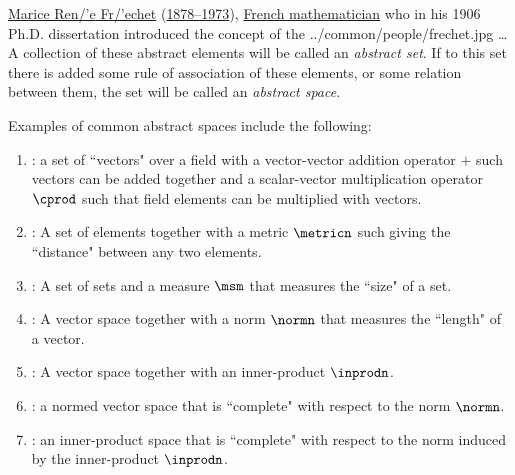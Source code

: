 \qboxnps
  {\href{http://en.wikipedia.org/wiki/Frechet}{Marice Ren{/'e} Fr{/'e}chet}
   (\href{http://www-history.mcs.st-andrews.ac.uk/Timelines/TimelineF.html}{1878--1973}),
   \href{http://www-history.mcs.st-andrews.ac.uk/BirthplaceMaps/Places/France.html}{French mathematician}
   who in his 1906 Ph.D. dissertation introduced the concept of the 
   \footnotemark
  }
  {../common/people/frechet.jpg}
  {\ldots
   A collection of these abstract elements will be called an \emph{abstract set}.
   If to this set there is added some rule of association of these elements,
   or some relation between them,
   the set will be called an \emph{abstract space}.}

Examples of common abstract spaces include the following:
\begin{enumerate}
  \item {}:
        a set of ``vectors" over a field
        with a vector-vector addition operator $+$ such vectors can be added together
        and a scalar-vector multiplication operator $\cprod$
        such that field elements can be multiplied with vectors.
        \\

  \item {}:
        A set of elements together with a metric $\metricn$ such giving the ``distance"
        between any two elements.
        \\

  \item {}:
        A set of sets and a measure $\msm$ that measures the ``size" of a set.

  \item {}:
        A vector space together with a norm $\normn$ that measures the ``length" of a vector.
        \\

  \item {}:
        A vector space together with an inner-product $\inprodn$.

  \item {}:
        a normed vector space that is ``complete" with respect to the norm $\normn$.
        \\

  \item {}:
        an inner-product space that is ``complete" with respect to the norm induced by the
        inner-product $\inprodn$.
        \\
\end{enumerate}

